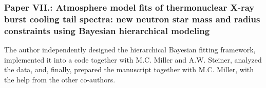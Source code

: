 \subsubsection*{Paper VII.: Atmosphere model fits of thermonuclear X-ray burst cooling tail spectra: new neutron star mass and radius constraints using Bayesian hierarchical modeling}
The author independently designed the hierarchical Bayesian fitting framework, implemented it into a code together with M.C. Miller and A.W. Steiner, analyzed the data, and, finally, prepared the manuscript together with M.C. Miller, with the help from the other co-authors.



